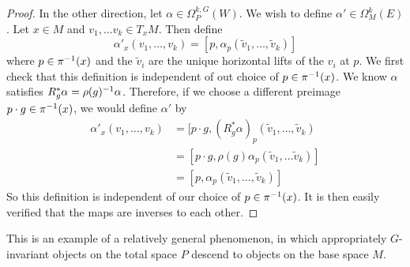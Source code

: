 \begin{proof}
In the other direction, let $\alpha \in \Omega^{k,G}_P(W)$. We wish to define
$\alpha' \in \Omega_M^k(E)$. Let $x \in M$ and $v_1, \ldots v_k \in T_xM$. Then
define
\[
\alpha'_x(v_1, \ldots, v_k) = [p,\alpha_{p}(\tilde{v}_1, \ldots, \tilde{v}_k)]
\]
where $p \in \pi^{-1}(x)$ and the $\tilde{v}_i$ are the unique horizontal lifts
of the $v_i$ at $p$. We first check that this definition is independent
of out choice of $p \in \pi^{-1}(x)$. We know $\alpha$ satisfies
$R_g^*\alpha = \rho(g)^{-1}\alpha$. Therefore, if we choose a different preimage
$p \cdot g \in \pi^{-1}(x)$, we would define $\alpha'$ by
\begin{align*}
\alpha'_x(v_1, \ldots, v_k) &=
[p \cdot g, (R_g^*\alpha)_{p}(\tilde{v}_1, \ldots, \tilde{v}_k) \\
&= [p \cdot g, \rho(g)\alpha_p(\tilde{v}_1, \ldots \tilde{v}_k)] \\
&= [p,\alpha_p(\tilde{v}_1, \ldots, \tilde{v}_k)]
\end{align*}
So this definition is independent of our choice of $p \in \pi^{-1}(x)$. It
is then easily verified that the maps are inverses to each other.
\end{proof}
%
This is an example of a relatively general phenomenon, in which appropriately
$G$-invariant objects on the total space $P$ descend to objects on the base space
$M$. \\

